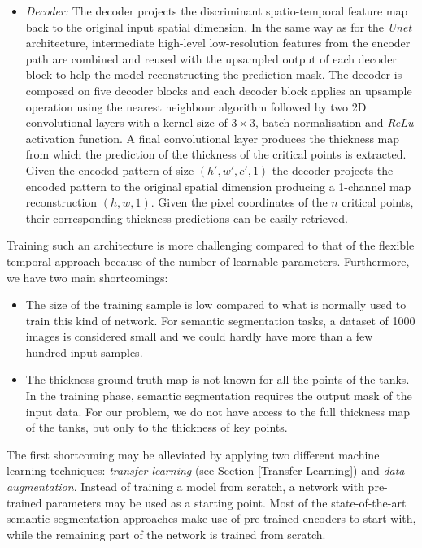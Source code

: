 \begin{itemize}
    \item \textit{Decoder:} The decoder projects the discriminant spatio-temporal feature map back to the original input spatial dimension. In the same way as for the \textit{Unet} architecture, intermediate high-level low-resolution features from the encoder path are combined and reused with the upsampled output of each decoder block to help the model reconstructing the prediction mask. The decoder is composed on five decoder blocks and each decoder block applies an upsample operation using the nearest neighbour algorithm followed by two 2D convolutional layers with a kernel size of $3\times 3$, batch normalisation and \textit{ReLu} activation function. A final convolutional layer produces the thickness map from which the prediction of the thickness of the critical  points is extracted. Given the encoded pattern of size $(h', w', c', 1)$ the decoder projects the encoded pattern to the original spatial dimension producing a 1-channel map reconstruction $(h, w, 1)$. Given the pixel coordinates of the $n$ critical points, their corresponding thickness predictions can be easily retrieved.
\end{itemize}

Training such an architecture is more challenging compared to that of the flexible temporal approach because of the number of learnable parameters. Furthermore, we have two main shortcomings:

\begin{itemize}
    \item The size of the training sample is low compared to what is normally used to train this kind of network. For semantic segmentation tasks, a dataset of 1000 images is considered small and we could hardly have more than a few hundred input samples.
    \item The thickness ground-truth map is not known for all the points of the tanks. In the training phase, semantic segmentation requires the output mask of the input data. For our problem, we do not have access to the full thickness map of the tanks, but only to the thickness of key points.
\end{itemize}

The first shortcoming may be alleviated by applying two different machine learning techniques: \textit{transfer learning} (see Section \ref{Transfer Learning}) and \textit{data augmentation}. Instead of training a model from scratch, a network with pre-trained parameters may be used as a starting point. Most of the state-of-the-art semantic segmentation approaches make use of pre-trained encoders to start with, while the remaining part of the network is trained from scratch.  

